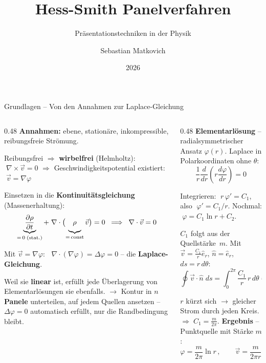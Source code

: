 \documentclass[aspectratio=169]{beamer}
\title{Hess-Smith Panelverfahren}
\subtitle{Präsentationstechniken in der Physik}
\author{Sebastian Matkovich}
\institute{TU Wien}
\date{2026}
\begin{document}
\begin{frame}
  \titlepage
\end{frame}

\begin{frame}{Grundlagen -- Von den Annahmen zur Laplace-Gleichung}
\footnotesize

\begin{columns}[T]
\begin{column}{0.48\textwidth}
\textbf{Annahmen:} ebene, stationäre, inkompressible, reibungsfreie Strömung.

\smallskip
Reibungsfrei $\Rightarrow$ \textbf{wirbelfrei} (Helmholtz):
$\;\nabla\times\vec{v}=0$
\;\;$\Rightarrow$ Geschwindigkeitspotential existiert:
$\;\vec{v} = \nabla\varphi$

Einsetzen in die \textbf{Kontinuitätsgleichung} (Massenerhaltung):
\vspace{-2mm}
\[
  \underbrace{\frac{\partial\rho}{\partial t}}_{=\,0\;\text{(stat.)}}
  +\;\nabla\cdot\bigl(\underbrace{\rho\vphantom{\frac{\partial}{\partial t}}}_{=\,\text{const}}\vec{v}\bigr) = 0
  \;\;\Longrightarrow\;\;
  \nabla\cdot\vec{v} = 0
\]

\vspace{-3mm}
Mit $\vec{v}=\nabla\varphi$:
$\;\;\nabla\cdot(\nabla\varphi) = \Delta\varphi = 0$
\;-- die \textbf{Laplace-Gleichung}.

\smallskip
Weil sie \textbf{linear} ist, erfüllt jede Überlagerung
von Elementarlösungen sie ebenfalls.
$\to$ Kontur in $n$ \textbf{Panele} unterteilen, auf jedem
Quellen ansetzen -- $\Delta\varphi=0$ automatisch
erfüllt, nur die Randbedingung bleibt.
\end{column}
\begin{column}{0.48\textwidth}
\textbf{Elementarlösung} -- radialsymmetrischer Ansatz
$\varphi(r)$. Laplace in Polarkoordinaten ohne $\theta$:
\vspace{-1mm}
\[
  \frac{1}{r}\frac{d}{dr}\!\left(r\frac{d\varphi}{dr}\right) = 0
\]

\vspace{-2mm}
Integrieren: $\;r\,\varphi' = C_1$, also $\;\varphi' = C_1/r$.
Nochmal: $\;\varphi = C_1 \ln r + C_2$.

\smallskip
$C_1$ folgt aus der Quellstärke~$m$.
Mit $\vec{v}=\frac{C_1}{r}\hat{e}_r$, $\hat{n}=\hat{e}_r$, $ds=r\,d\theta$:
\vspace{-1mm}
\[
  \oint \vec{v}\!\cdot\!\hat{n}\;ds
  = \int_0^{2\pi}\!\frac{C_1}{r}\,r\,d\theta
  = 2\pi C_1 \stackrel{!}{=} m
\]

\vspace{-3mm}
$r$ kürzt sich $\to$ gleicher Strom durch jeden Kreis.
$\Rightarrow\; C_1 = \tfrac{m}{2\pi}$.
\textbf{Ergebnis} -- Punktquelle mit Stärke $m$:
\vspace{-1mm}
\[
  \boxed{\varphi = \frac{m}{2\pi}\ln r\,,
  \qquad
  \vec{v} = \frac{m}{2\pi r}\,\hat{e}_r}
\]
\end{column}
\end{columns}

\end{frame}
\end{document}

